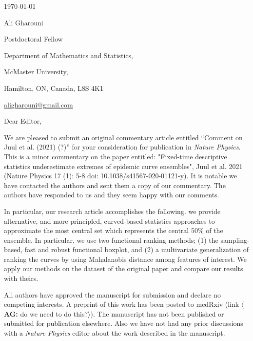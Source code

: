 \documentclass[12pt,letterpaper]{letter}
\newcommand{\ali}[1]{\textcolor{irena}{$\langle$\textbf{AG:} #1$\rangle$}}
\newcommand{\journalname}{\emph{Nature Physics}}
\begin{document}
\begin{multicols}{2}
\footnotesize
\begin{flushleft}

% 

\vfill

{\normalsize \mydate
\today}
\end{flushleft}

\columnbreak

\begin{flushright}
Ali Gharouni

Postdoctoral Fellow 

Department of Mathematics and Statistics,

McMaster University,

Hamilton, ON, Canada, L8S 4K1

\href{mailto:aligharouni@gmail.com}{aligharouni@gmail.com}
\end{flushright}

\end{multicols}

\setlength{\parskip}{1em}
\thispagestyle{empty}

\vspace{-1em}

Dear Editor,

We are pleased to submit an original commentary article entitled
``Comment on Juul et al. (2021) (?)'' for your consideration for publication in \journalname{}. This is a minor commentary on the paper entitled: "Fixed-time descriptive statistics underestimate extremes of epidemic curve ensembles", Juul et al. 2021 (Nature Physics 17 (1): 5-8 doi: 10.1038/s41567-020-01121-y). It is notable we have contacted the authors and sent them a copy of our commentary. The authors have responded to us and they seem happy with our comments. 

In particular, our research article accomplishes the following.
we provide alternative, and more principled, curved-based statistics approaches to approximate the most central set which represents the central 50\% of the ensemble. In particular, we use two functional ranking methods; (1) the sampling-based, fast and robust functional boxplot, and (2) a multivariate generalization of ranking the curves by using Mahalanobis distance among features of interest. We apply our methods on the dataset of the original paper and compare our results with theirs.

All authors have approved the manuscript for submission and declare no competing interests. A preprint of this work has been posted to medRxiv (link \ali{do we need to do this?}). The manuscript has not been published or submitted for publication elsewhere. Also we have not had any prior discussions with a \journalname{} editor about the work described in the manuscript. 
\end{document}
